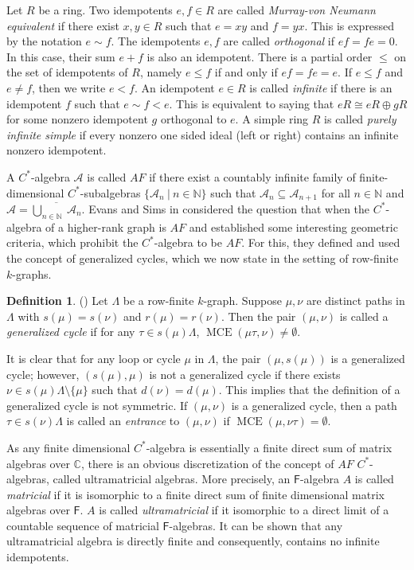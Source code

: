 \documentclass[a4paper,reqno,12pt]{amsart}
\numberwithin{equation}{section}
\theoremstyle{definition}
\newtheorem{dfn}[thm]{Definition}
\theoremstyle{remark}
\newcommand{\MCE}{\operatorname{MCE}}
\begin{document}
Let $R$ be a ring. Two idempotents $e,f\in R$ are called \emph{Murray-von Neumann equivalent} if there exist $x,y\in R$ such that $e=xy$ and $f=yx$. This is expressed by the notation $e\sim f$. The idempotents $e,f$ are called \emph{orthogonal} if $ef=fe=0$. In this case, their sum $e+f$ is also an idempotent. There is a partial order $\leqslant$ on the set of idempotents of $R$, namely $e\leqslant f$ if and only if $ef=fe=e$. If $e\leqslant f$ and $e\neq f$, then we write $e< f$. An idempotent $e\in R$ is called \emph{infinite} if there is an idempotent $f$ such that $e\sim f< e$. This is equivalent to saying that $eR\cong eR\oplus gR$ for some nonzero idempotent $g$ orthogonal to $e$. A simple ring $R$ is called \emph{purely infinite simple} if every nonzero one sided ideal (left or right) contains an infinite nonzero idempotent. 

A $C^*$-algebra $\mathcal{A}$ is called $AF$ if there exist a countably infinite family of finite-dimensional $C^*$-subalgebras $\{\mathcal{A}_n~|~n\in \mathbb{N}\}$ such that $\mathcal{A}_n\subseteq \mathcal{A}_{n+1}$ for all $n\in \mathbb{N}$ and $\mathcal{A}=\overline{\displaystyle{\bigcup_{n\in \mathbb{N}}}~\mathcal{A}_n}$. Evans and Sims in \cite{Evans} considered the question that when the $C^*$-algebra of a higher-rank graph is $AF$ and established some interesting geometric criteria, which prohibit the $C^*$-algebra to be $AF$. For this, they defined and used the concept of generalized cycles, which we now state in the setting of row-finite $k$-graphs.
\begin{dfn}
(\cite[Definition 3.1]{Evans}) Let $\Lambda$ be a row-finite $k$-graph. Suppose $\mu,\nu$ are distinct paths in $\Lambda$ with $s(\mu)=s(\nu)$ and $r(\mu)=r(\nu)$. Then the pair $(\mu,\nu)$ is called a \emph{generalized cycle} if for any $\tau\in s(\mu)\Lambda$, $\MCE(\mu\tau,\nu)\neq \emptyset$.     
\end{dfn}

It is clear that for any loop or cycle $\mu$ in $\Lambda$, the pair $(\mu,s(\mu))$ is a generalized cycle; however, $(s(\mu),\mu)$ is not a generalized cycle if there exists $\nu\in s(\mu)\Lambda\setminus \{\mu\}$ such that $d(\nu)=d(\mu)$. This implies that the definition of a generalized cycle is not symmetric. If $(\mu,\nu)$ is a generalized cycle, then a path $\tau\in s(\nu)\Lambda$ is called an \emph{entrance} to $(\mu,\nu)$ if $\MCE(\mu,\nu\tau)=\emptyset$.    

As any finite dimensional $C^*$-algebra is essentially a finite direct sum of matrix algebras over $\mathbb{C}$, there is an obvious discretization of the concept of $AF$ $C^*$-algebras, called ultramatricial algebras. More precisely, an $\mathsf{F}$-algebra $A$ is called \emph{matricial} if it is isomorphic to a finite direct sum of finite dimensional matrix algebras over $\mathsf{F}$. $A$ is called \emph{ultramatricial} if it isomorphic to a direct limit of a countable sequence of matricial $\mathsf{F}$-algebras. It can be shown that any ultramatricial algebra is directly finite and consequently, contains no infinite idempotents.
\end{document}
